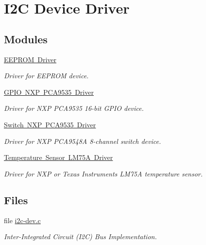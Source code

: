 \hypertarget{group__I2CDevice}{}\section{I2C Device Driver}
\label{group__I2CDevice}
\subsection*{Modules}
\begin{DoxyCompactItemize}
\item 
\mbox{\hyperlink{group__I2CEEPROM}{E\+E\+P\+R\+O\+M Driver}}
\begin{DoxyCompactList}\small\item\em Driver for E\+E\+P\+R\+OM device. \end{DoxyCompactList}\item 
\mbox{\hyperlink{group__I2CGPIONXPPCA9535}{G\+P\+I\+O N\+X\+P P\+C\+A9535 Driver}}
\begin{DoxyCompactList}\small\item\em Driver for N\+XP P\+C\+A9535 16-\/bit G\+P\+IO device. \end{DoxyCompactList}\item 
\mbox{\hyperlink{group__I2CSWITCHNXPPCA9548A}{Switch N\+X\+P P\+C\+A9535 Driver}}
\begin{DoxyCompactList}\small\item\em Driver for N\+XP P\+C\+A9548A 8-\/channel switch device. \end{DoxyCompactList}\item 
\mbox{\hyperlink{group__I2CSensorLM75A}{Temperature Sensor L\+M75\+A Driver}}
\begin{DoxyCompactList}\small\item\em Driver for N\+XP or Texas Instruments L\+M75A temperature sensor. \end{DoxyCompactList}\end{DoxyCompactItemize}
\subsection*{Files}
\begin{DoxyCompactItemize}
\item 
file \mbox{\hyperlink{i2c-dev_8c}{i2c-\/dev.\+c}}
\begin{DoxyCompactList}\small\item\em Inter-\/\+Integrated Circuit (I2C) Bus Implementation. \end{DoxyCompactList}\end{DoxyCompactItemize}

